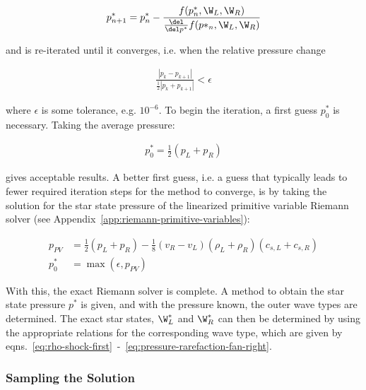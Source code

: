\begin{align}
	p^*_{n+1} = p^*_n - \frac{f(p^*_n, \W_L, \W_R)}{\frac{\del}{\del p^*}f(p*_n, \W_L, \W_R)}
\end{align}


and is re-iterated until it converges, i.e. when the relative pressure change

\begin{align}
	\frac{|p_k - p_{k+1}|}{\frac{1}{2} | p_k + p_{k+1} | } < \epsilon
\end{align}

where $\epsilon$ is some tolerance, e.g. $10^{-6}$. To begin the iteration, a first guess $p_0^*$
is necessary. Taking the average pressure:

\begin{align}
	p_0^* = \frac{1}{2} (p_L + p_R)
\end{align}

gives acceptable results. A better first guess, i.e. a guess that typically leads to fewer required
iteration steps for the method to converge, is by taking the solution for the star state pressure
of the linearized primitive variable Riemann solver (see
Appendix~\ref{app:riemann-primitive-variables}):

\begin{align}
	p_{PV} &=
        \frac{1}{2} (p_L + p_R) - \frac{1}{8} (v_R - v_L)(\rho_L + \rho_R)(c_{s,L} + c_{s,R})\\
	p_0^* &= \max(\epsilon, p_{PV})
\end{align}


With this, the exact Riemann solver is complete. A method to obtain the star state pressure $p^*$
is given, and with the pressure known, the outer wave types are determined. The exact star states,
$\W_L^*$ and $\W_R^*$ can then be determined by using the appropriate relations for the
corresponding wave type, which are given by
eqns.~\ref{eq:rho-shock-first}~-~\ref{eq:pressure-rarefaction-fan-right}.












\subsubsection{Sampling the Solution}



